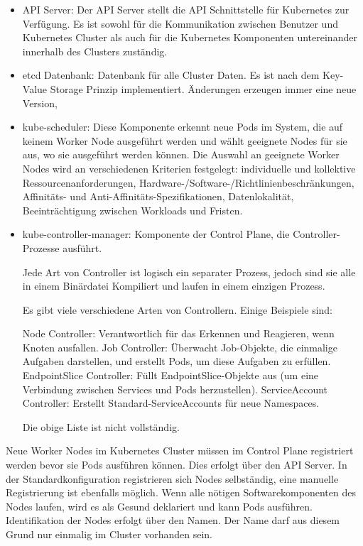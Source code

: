 \begin{itemize}
	\item API Server: Der API Server stellt die API Schnittstelle für Kubernetes zur Verfügung. Es ist sowohl für die Kommunikation zwischen Benutzer und Kubernetes Cluster als auch für die Kubernetes Komponenten untereinander innerhalb des Clusters zuständig. 
	\item etcd Datenbank: Datenbank für alle Cluster Daten. Es ist nach dem Key-Value Storage 
	Prinzip implementiert. Änderungen erzeugen immer eine neue Version, 
	\item kube-scheduler: Diese Komponente erkennt neue Pods im System, die auf keinem Worker Node ausgeführt werden und wählt geeignete Nodes für sie aus, wo sie ausgeführt werden können. Die Auswahl an geeignete Worker Nodes wird an verschiedenen Kriterien festgelegt: individuelle und kollektive Ressourcenanforderungen, Hardware-/Software-/Richtlinienbeschränkungen, Affinitäts- und Anti-Affinitäts-Spezifikationen, Datenlokalität, Beeinträchtigung zwischen Workloads und Fristen.
	\item kube-controller-manager: Komponente der Control Plane, die Controller-Prozesse ausführt.
	
	Jede Art von Controller ist logisch ein separater Prozess, jedoch sind sie alle in einem Binärdatei Kompiliert und laufen in einem einzigen Prozess.
	
	Es gibt viele verschiedene Arten von Controllern. Einige Beispiele sind:

    Node Controller: Verantwortlich für das Erkennen und Reagieren, wenn Knoten ausfallen.
    Job Controller: Überwacht Job-Objekte, die einmalige Aufgaben darstellen, und erstellt Pods, um diese Aufgaben zu erfüllen.
    EndpointSlice Controller: Füllt EndpointSlice-Objekte aus (um eine Verbindung zwischen Services und Pods herzustellen).
    ServiceAccount Controller: Erstellt Standard-ServiceAccounts für neue Namespaces.

	Die obige Liste ist nicht vollständig.
\end{itemize}

Neue Worker Nodes im Kubernetes Cluster müssen im Control Plane registriert werden bevor sie Pods ausführen können. Dies erfolgt über den API Server. In der Standardkonfiguration registrieren sich Nodes selbständig, eine manuelle Registrierung ist ebenfalls möglich. Wenn alle nötigen Softwarekomponenten des Nodes laufen, wird es als Gesund deklariert und kann Pods ausführen. Identifikation der Nodes erfolgt über den Namen. Der Name darf aus diesem Grund nur einmalig im Cluster vorhanden sein. 

